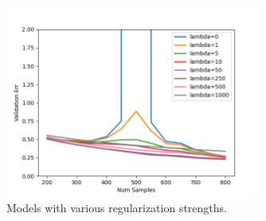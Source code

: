 \begin{answer}
    \begin{figure}[H]
        \centering
        \includegraphics[width=0.75\textwidth]{../src/doubledescent/reg.png}
        \caption{Models with various regularization strengths.}
        \label{fig:reg}
    \end{figure}
\end{answer}
